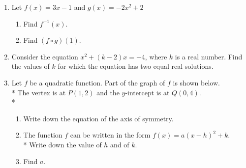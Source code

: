 \documentclass[12pt, twoside]{article}
\begin{document}
\begin{enumerate}
\newpage

\item Let $f(x)=3x-1$ and $g(x)=-2x^2+2$
\begin{enumerate}
    \item Find $f^{-1}(x)$.
    \item Find $(f \circ g)(1)$.
\end{enumerate}

\item Consider the equation $x^2 + (k-2)x=-4$, where $k$ is a real number. Find the values of $k$ for which the equation has two equal real solutions.

\item Let $f$ be a quadratic function. Part of the graph of $f$ is shown below.\\*
The vertex is at $P(1,2)$ and the $y$-intercept is at $Q(0, 4)$.\\*

  \begin{figure}[!htbp]
  \begin{center}
  \end{center}
  \end{figure}

\begin{enumerate}
    \item Write down the equation of the axis of symmetry.
    \item The function $f$ can be written in the form $f(x)=a(x-h)^2 +k$. \\*
    Write down the value of $h$ and of $k$.
    \item Find $a$.
\end{enumerate}


\end{enumerate}
\end{document}
